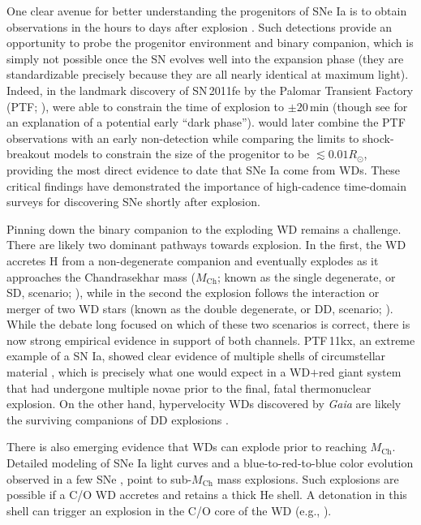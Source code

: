 \documentclass[twocolumn]{aastex63}
\begin{document}
One clear avenue for better understanding the progenitors of SNe Ia is to
obtain observations in the hours to days after explosion \citep{Maoz14}. Such
detections provide an opportunity to probe the progenitor environment and
binary companion, which is simply not possible once the SN evolves well into
the expansion phase (they are standardizable precisely because they are all
nearly identical at maximum light). Indeed, in the landmark discovery of
SN\,2011fe by the Palomar Transient Factory (PTF; \citealt{law09,rau09}),
\citet{Nugent11} were able to constrain the time of explosion to $\pm 20$\,min
(though see \citealt{Piro13} for an explanation of a potential early ``dark
phase''). \citet{Bloom12a} would later combine the PTF observations with an
early non-detection while comparing the limits to shock-breakout models to
constrain the size of the progenitor to be $\lesssim 0.01 R_\odot$, providing
the most direct evidence to date that SNe Ia come from WDs. These critical
findings have demonstrated the importance of high-cadence time-domain surveys
for discovering SNe shortly after explosion.

Pinning down the binary companion to the exploding WD remains a challenge.
There are likely two dominant pathways towards explosion. In the first, the WD
accretes H from a non-degenerate companion and eventually explodes as it
approaches the Chandrasekhar mass ($M_\mathrm{Ch}$; known as the single
degenerate, or SD, scenario; \citealt{Whelan73}), while in the second the
explosion follows the interaction or merger of two WD stars (known as the
double degenerate, or DD, scenario; \citealt{Webbink84}). While the debate
long focused on which of these two scenarios is correct, there is now strong
empirical evidence in support of both channels. PTF\,11kx, an extreme example
of a SN Ia, showed clear evidence of multiple shells of circumstellar material
\citep{Dilday12}, which is precisely what one would expect in a WD$+$red giant
system that had undergone multiple novae prior to the final, fatal
thermonuclear explosion. On the other hand, hypervelocity WDs discovered by
\textit{Gaia} are likely the surviving companions of DD explosions
\citep{Shen18}.

There is also emerging evidence that WDs can explode prior to reaching
$M_\mathrm{Ch}$. Detailed modeling of SNe Ia light curves \citep{Scalzo14a} and
a blue-to-red-to-blue color evolution observed in a few SNe
\citep{Jiang17,Noebauer17,Polin19,De19}, point to sub-$M_\mathrm{Ch}$ mass
explosions. Such explosions are possible if a C/O WD accretes and retains a
thick He shell. A detonation in this shell can trigger an explosion in the C/O
core of the WD (e.g., \citealt{Nomoto82,Nomoto82a}). 
\end{document}
